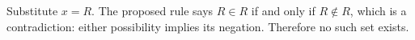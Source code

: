 Substitute $x=R$. The proposed rule says $R\in R$ if and only if $R\notin R$, which is a contradiction: either possibility implies its negation. Therefore no such set exists.
